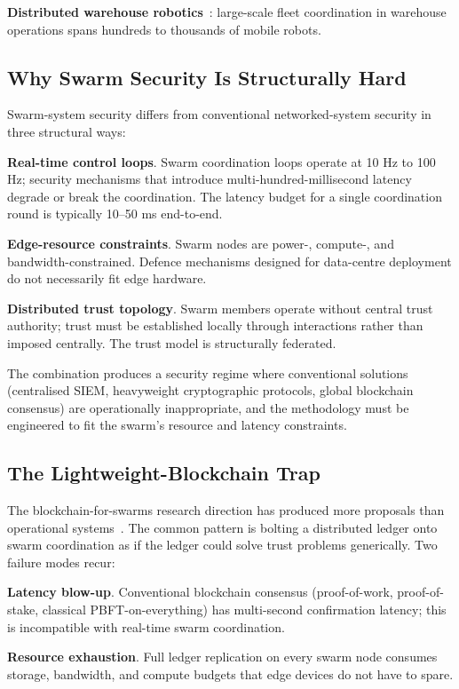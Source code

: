 \documentclass[sigconf,nonacm]{acmart}
\begin{document}
\textbf{Distributed warehouse robotics}~\cite{amazon2024robotics,
ocado2024warehouse}: large-scale fleet coordination in warehouse
operations spans hundreds to thousands of mobile robots.

\subsection{Why Swarm Security Is Structurally Hard}

Swarm-system security differs from conventional networked-system
security in three structural ways:

\textbf{Real-time control loops}. Swarm coordination loops operate
at 10 Hz to 100 Hz; security mechanisms that introduce
multi-hundred-millisecond latency degrade or break the
coordination. The latency budget for a single coordination round
is typically 10--50 ms end-to-end.

\textbf{Edge-resource constraints}. Swarm nodes are
power-, compute-, and bandwidth-constrained. Defence mechanisms
designed for data-centre deployment do not necessarily fit edge
hardware.

\textbf{Distributed trust topology}. Swarm members
operate without central trust authority; trust must be established
locally through interactions rather than imposed centrally. The
trust model is structurally federated.

The combination produces a security regime where conventional
solutions (centralised SIEM, heavyweight cryptographic protocols,
global blockchain consensus) are operationally inappropriate, and
the methodology must be engineered to fit the swarm's resource
and latency constraints.

\subsection{The Lightweight-Blockchain Trap}

The blockchain-for-swarms research direction has produced more
proposals than operational systems~\cite{kapitonov2024robotchain}.
The common pattern is bolting a distributed ledger onto swarm
coordination as if the ledger could solve trust problems
generically. Two failure modes recur:

\textbf{Latency blow-up}. Conventional blockchain consensus
(proof-of-work, proof-of-stake, classical PBFT-on-everything) has
multi-second confirmation latency; this is incompatible with
real-time swarm coordination.

\textbf{Resource exhaustion}. Full ledger replication on every
swarm node consumes storage, bandwidth, and compute budgets that
edge devices do not have to spare.
\end{document}
